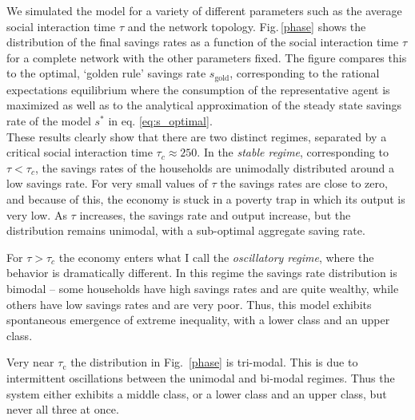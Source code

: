 We simulated the model for a variety of different parameters such as the average social interaction time $\tau$ and the network topology. Fig.\,\ref{phase} shows the distribution of the final savings rates as a function of the social interaction time $\tau$ for a complete network with the other parameters fixed.  The figure compares this to the optimal, `golden rule' savings rate $s_\mathrm{gold}$,  corresponding to the rational expectations equilibrium where the consumption of the representative agent is maximized as well as to the analytical approximation of the steady state savings rate of the model $s^*$ in eq. \eqref{eq:s_optimal}.\\

These results clearly show that there are two distinct regimes, separated by a critical social interaction time $\tau_{c} \approx 250$.
In the \emph{stable regime}, corresponding to $\tau < \tau_{c}$, the savings rates of the households are unimodally distributed around a low savings rate.  For very small values of $\tau$ the savings rates are close to zero, and because of this, the economy is stuck in a poverty trap in which its output is very low.  As $\tau$ increases, the savings rate and output increase, but the distribution remains unimodal, with a sub-optimal aggregate saving rate.

For $\tau \! > \! \tau_{c}$ the economy enters what I call the \emph{ oscillatory regime}, where the behavior is dramatically different. In this regime the savings rate distribution is bimodal -- some households have high savings rates and are quite wealthy, while others have low savings rates and are very poor.  Thus, this model exhibits spontaneous emergence of extreme inequality, with a lower class and an upper class.

Very near $\tau_\mathrm{c}$ the distribution in Fig.~\ref{phase} is tri-modal. This is due to intermittent oscillations between the unimodal and bi-modal regimes. Thus the system either exhibits a middle class, or a lower class and an upper class, but never all three at once.

